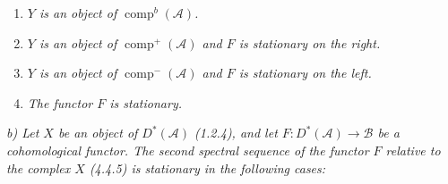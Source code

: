 \begin{enumerate}
\item[1)] \textit{$Y$ is an object of $\operatorname{comp}^{b}(\mathcal A)$.}
\item[2)] \textit{$Y$ is an object of $\operatorname{comp}^{+}(\mathcal A)$
and $F$ is stationary on the right.}
\item[3)] \textit{$Y$ is an object of $\operatorname{comp}^{-}(\mathcal A)$
and $F$ is stationary on the left.}
\item[4)] \textit{The functor $F$ is stationary.}
\end{enumerate}

\noindent\textit{b) Let $X$ be an object of $D^*(\mathcal A)$ (1.2.4), and
let $F\colon D^*(\mathcal A)\longrightarrow\mathcal B$ be a cohomological
functor. The second spectral sequence of the functor $F$ relative to the
complex $X$ (4.4.5) is stationary in the following cases:}
\endgroup
